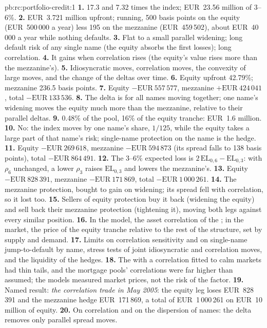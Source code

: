 \begin{solution}{pb:rc:portfolio-credit:1}
\textbf{1.} 17.3 and 7.32 times the index; EUR~23.56 million of 3--6\%.
\textbf{2.} EUR~3.721 million upfront; running, 500 basis points on the equity (EUR~500\,000 a
year) less 195 on the mezzanine (EUR~459\,502), about EUR~40\,000 a year while nothing
defaults.
\textbf{3.} Flat to a small parallel widening; long default risk of any single name (the
equity absorbs the first losses); long correlation.
\textbf{4.} It gains when correlation rises (the equity's value rises more than the
mezzanine's).
\textbf{5.} Idiosyncratic moves, correlation moves, the convexity of large moves, and the
change of the deltas over time.
\textbf{6.} Equity upfront 42.79\%; mezzanine 236.5 basis points.
\textbf{7.} Equity $-\text{EUR}~557\,577$, mezzanine $+\text{EUR}~424\,041$, total
$-\text{EUR}~133\,536$.
\textbf{8.} The delta is for all names moving together; one name's widening moves the
equity much more than the mezzanine, relative to their parallel deltas.
\textbf{9.} 0.48\% of the pool, 16\% of the equity tranche: EUR~1.6 million.
\textbf{10.} No: the index moves by one name's share, $1/125$, while the equity takes a large
part of that name's risk; single-name protection on the name is the hedge.
\textbf{11.} Equity $-\text{EUR}~269\,618$, mezzanine $-\text{EUR}~594\,873$ (its spread falls to 138
basis points), total $-\text{EUR}~864\,491$.
\textbf{12.} The 3--6\% expected loss is $2\,\mathrm{EL}_{0,6}-\mathrm{EL}_{0,3}$: with $\rho_6$ unchanged, a lower
$\rho_3$ raises $\mathrm{EL}_{0,3}$ and lowers the mezzanine's.
\textbf{13.} Equity $-\text{EUR}~828\,391$, mezzanine $-\text{EUR}~171\,869$, total $-\text{EUR}~1\,000\,261$.
\textbf{14.} The mezzanine protection, bought to gain on widening; its spread fell with
correlation, so it lost too.
\textbf{15.} Sellers of equity protection buy it back (widening the equity) and sell back their
mezzanine protection (tightening it), moving both legs against every similar position.
\textbf{16.} In the model, the asset correlation of the ; in the market, the
price of the equity tranche relative to the rest of the structure, set by supply and
demand.
\textbf{17.} Limits on correlation sensitivity and on single-name jump-to-default by name, stress
tests of joint idiosyncratic and correlation moves, and the liquidity of the hedges.
\textbf{18.} The  with a correlation fitted to calm markets had thin tails, and
the mortgage pools' correlations were far higher than assumed; the models measured
market prices, not the risk of the factor.
\textbf{19.} Named result: \emph{the correlation trade in May 2005}: the equity leg loses
EUR~828\,391 and the mezzanine hedge EUR~171\,869, a total of EUR~1\,000\,261 on EUR~10
million of equity.
\textbf{20.} On correlation and on the dispersion of names: the delta removes only parallel
spread moves.
\end{solution}

